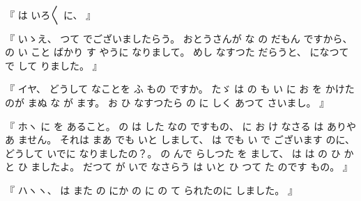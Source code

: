 
%
『
は
いろ〳〵
に、
』

%
『
いゝえ、
%
つて
でございましたらう。
%
おとうさんが
な
の
だもん
ですから、
%
の
い
こと
ばかり
す
やうに
なりまして。
%
めし
なすつた
だらうと、
%
になつて
で
して
りました。
』

%
『
イヤ、
%
どうして
なことを
ふ
もの
ですか。
%
たゞ
は
の
も
い
に
お
を
かけたのが
まぬ
な
が
ます。
%
お
ひ
なすつたら
の
に
しく
あつて
さいまし。
』

%
『
ホヽ
に
を
あること。
%
の
は
した
なの
ですもの、
%
に
お
け
なさる
は
ありやあ
ません。
%
それは
%
まあ
でも
いと
しまして、
%
は
でも
い
で
ございます
のに、
%
どうして
いでに
なりましたの？。
%
の
んで
%
らしつた
を
まして、
%
は
は
の
ひ
かと
ひ
ましたよ。
%
だつて
が
いで
なさらう
は
いと
ひ
つて
%
た
のです
もの。
』

%
『
ハヽヽ、
%
は
また
の
にか
の
に
の
て
られたのに
しました。
』

